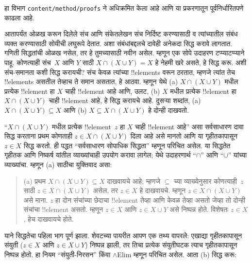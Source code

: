 \documentclass[../../../include/open-logic-section]{subfiles}
\begin{document}

\begin{editorial}
हा विभाग \verb|content/method/proofs| ने अधिक्रमित केला आहे आणि
या प्रकरणातून पूर्वनिर्धारितपणे काढला आहे.
\end{editorial}

\begin{explain}
आतापर्यंत ओळख करून दिलेले संच आणि संकेतलेखन
संच निर्दिष्ट करण्यासाठी व त्यांच्यातील संबंध व्यक्त
करण्यासाठी सोयीची लघुरूपे देतात. अशा संबंधांबद्दलचे
दावेही अनेकदा सिद्ध करावे लागतात. गणिती सिद्धतांची
ओळख नसेल, तर हे तुमच्यासाठी नवीन असेल. म्हणून एक
सोपे उदाहरण टप्प्याटप्प्याने पाहू. कोणत्याही संच~$X$
आणि $Y$ साठी $X \cap
(X \cup Y) = X$ हे नेहमी खरे असते, हे सिद्ध करू.
अशी संच-समानता कशी सिद्ध करायची? संच केवळ त्यांच्या
!!{element}s वरून ठरतात, म्हणजे त्यांत तेच !!{element}s
असतील तेव्हाच ते समान असतात, हे आठवा. म्हणून येथे
(a) $X \cap (X \cup
Y)$ मधील प्रत्येक !!{element} हा $X$ चाही !!{element}
आहे आणि, उलट, (b) $X$ मधील प्रत्येक !!{element}
हा $X \cap (X \cup Y)$ चाही !!{element} आहे, हे
सिद्ध करायचे आहे. दुसऱ्या शब्दांत, (a) $X \cap (X \cup Y) \subseteq X$
आणि (b) $X \subseteq X \cap (X \cup Y)$ हे दोन्ही दाखवतो.

“$X \cap (X
\cup Y)$ मधील प्रत्येक !!{element}~$z$ हा $X$ चाही !!{element}
आहे” असा सर्वसाधारण दावा सिद्ध करताना प्रथम कोणताही
$z \in X \cap (X \cup Y)$ दिला आहे असे मानतो आणि या
गृहीतकापासून $z \in X$ सिद्ध करतो. ही पद्धत “सर्वसाधारण
सोपाधिक सिद्धता” म्हणून परिचित असेल. या सिद्धतेत
गृहीतक आणि निष्कर्ष यांतील व्याख्यांचाही उपयोग करावा
लागेल; येथे उदाहरणार्थ “$\cap$” आणि “$\cup$” यांच्या
व्याख्यांचा. म्हणून (a) साठीचा युक्तिवाद असा:


\begin{quote}
(a) प्रथम $X \cap (X \cup Y) \subseteq X$ दाखवायचे आहे;
म्हणजे $\subseteq$ च्या व्याख्येनुसार कोणत्याही~$z$ साठी
$z \in X \cap (X \cup Y)$ असेल, तर $z \in X$ हे दाखवायचे.
म्हणून $z \in X \cap (X \cup
Y)$ असे माना. $z$ हा दोन संचांच्या छेदाचा !!{element}
तेव्हा आणि केवळ तेव्हा असतो जेव्हा तो दोन्ही संचांचा
!!{element} असतो. म्हणून $z \in X$ आणि $z \in X \cup Y$
असे निष्पन्न होते. विशेषतः $z \in X$, हेच दाखवायचे होते.
\end{quote}

याने सिद्धतेचा पहिला भाग पूर्ण झाला. शेवटच्या
पायरीत आपण एक तथ्य वापरले: एखाद्या गृहीतकापासून
संयुती ($z \in X$ आणि $z \in X
\cup Y$) निष्पन्न झाली, तर तिचा प्रत्येक संयुतीघटक
त्याच गृहीतकापासून निष्पन्न होतो. हा नियम “संयुती-निरसन”
किंवा $\land$Elim म्हणून परिचित असेल. आता (b) सिद्ध करू:


\end{explain}
\end{document}
